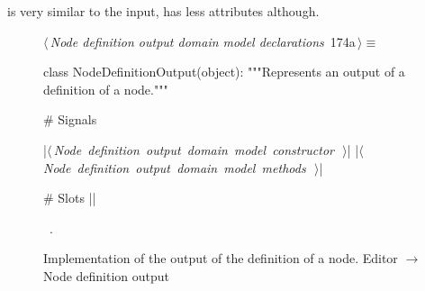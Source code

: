 \documentclass[%
    a4paper,    %
    justified,  %
    nobib,      %
    openany     %
]{tufte-book}
\makeatletter
\renewcommand{\label}[1]{\@tufte@label{##1}}%
\makeatother
\begin{document}
 is very similar to
the input, has less attributes although.

\begin{figure}[!htbp]
\begin{flushleft} \small
\begin{minipage}{\linewidth}\label{scrap144}\raggedright\small
{} $\langle\,${\itshape Node definition output domain model declarations}\nobreak\ {\footnotesize {174a}}$\,\rangle\equiv$
\vspace{-1ex}
\begin{pythoncode}
class NodeDefinitionOutput(object):
    """Represents an output of a definition of a node."""

    # Signals

    |\hbox{$\langle\,${\itshape Node definition output domain model constructor}\nobreak\ {\footnotesize {}}$\,\rangle$}|
    |\hbox{$\langle\,${\itshape Node definition output domain model methods}\nobreak\ {\footnotesize {}}$\,\rangle$}|

    # Slots
|\NWsep|
\end{pythoncode}
\vspace{1.5ex}
\footnotesize
\begin{list}{}{\setlength{\itemsep}{-\parsep}\setlength{\itemindent}{-\leftmargin}}
\item \NWtxtMacroRefIn\ .

\item{}
\end{list}
\end{minipage}\vspace{4ex}
\end{flushleft}
\caption{Implementation of the output of the definition of a node.
  \newline{}\newline{}Editor $\rightarrow$ Node definition output}
\end{figure}
\end{document}
